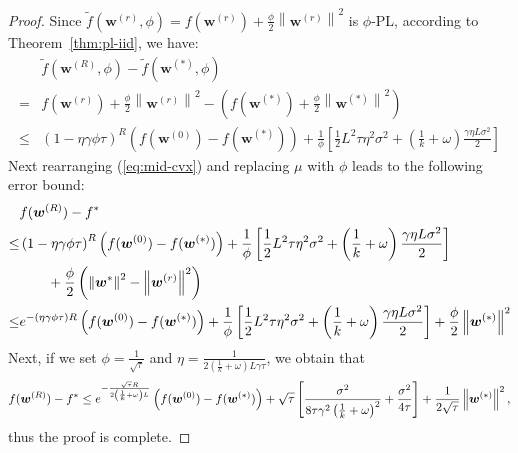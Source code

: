 \documentclass[sigconf, anonymous, review]{acmart}
\begin{document}
\begin{proof}
Since $\tilde{f}(\boldsymbol{w}^{(r)},\phi)=f(\boldsymbol{w}^{(r)})+\frac{\phi}{2}\left\|\boldsymbol{w}^{(r)}\right\|^2$ is $\phi$-PL, according to Theorem~\ref{thm:pl-iid}, we have:
\begin{align}
   & \tilde{f}(\boldsymbol{w}^{(R)},\phi)-\tilde{f}(\boldsymbol{w}^{(*)},\phi)\nonumber\\
   =&{f}(\boldsymbol{w}^{(r)})+\frac{\phi}{2}\left\|\boldsymbol{w}^{(r)}\right\|^2-\left({f}(\boldsymbol{w}^{(*)})+\frac{\phi}{2}\left\|\boldsymbol{w}^{(*)}\right\|^2\right)\nonumber\\
    \leq& \left(1-\eta\gamma{\phi\tau}\right)^R\left(f(\boldsymbol{w}^{(0)})-f(\boldsymbol{w}^{(*)})\right)+\frac{1}{{\phi}}\left[\frac{1}{2} L^2\tau\eta^2\sigma^2+\left(\frac{1}{k}+\omega\right)\frac{\gamma\eta L\sigma^2}{2}\right]\label{eq:mid-cvx}
\end{align}
Next rearranging (\ref{eq:mid-cvx}) and replacing $\mu$ with $\phi$ leads to the following error bound:
\begin{align}\notag
  &  {f}(\boldsymbol{w}^{(R)})-f^*\\\notag
  \leq& \left(1-\eta\gamma{\phi\tau}\right)^R\left(f(\boldsymbol{w}^{(0)})-f(\boldsymbol{w}^{(*)})\right)+\frac{1}{{\phi}}\left[\frac{1}{2} L^2\tau\eta^2\sigma^2+\left(\frac{1}{k}+\omega\right)\frac{\gamma\eta L\sigma^2}{2}\right]\\\notag
  &\qquad +\frac{\phi}{2}\left(\left\|\boldsymbol{w}^*\right\|^2-\left\|\boldsymbol{w}^{(r)}\right\|^2\right)\\\notag
    \leq& e^{-\left(\eta\gamma{\phi\tau}\right)R}\left(f(\boldsymbol{w}^{(0)})-f(\boldsymbol{w}^{(*)})\right)+\frac{1}{{\phi}}\left[\frac{1}{2} L^2\tau\eta^2\sigma^2+\left(\frac{1}{k}+\omega\right)\frac{\gamma\eta L\sigma^2}{2}\right] +\frac{\phi}{2}\left\|\boldsymbol{w}^{(*)}\right\|^2 
\end{align}
Next, if we set $\phi=\frac{1}{\sqrt{\tau}}$ and $\eta=\frac{1}{2\left(\frac{1}{k}+{\omega}\right)L\gamma \tau}$, we obtain that
\begin{equation}\notag
        {f}(\boldsymbol{w}^{(R)})-f^*
        \leq e^{-\frac{\sqrt{\tau}R}{2\left(\frac{1}{k}+\omega\right)L }}\left(f(\boldsymbol{w}^{(0)})-f(\boldsymbol{w}^{(*)})\right)+\sqrt{\tau}\left[\frac{\sigma^2}{8\tau\gamma^2\left(\frac{1}{k}+\omega\right)^2} +\frac{\sigma^2}{4\tau }\right] +\frac{1}{2\sqrt{\tau}}\left\|\boldsymbol{w}^{(*)}\right\|^2 ,
\end{equation}
thus the proof is complete. 
\end{proof}
\end{document}
